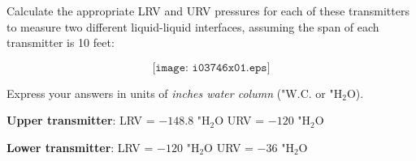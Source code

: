 

Calculate the appropriate LRV and URV pressures for each of these transmitters to measure two different liquid-liquid interfaces, assuming the span of each transmitter is 10 feet:

$$\texttt{[image: i03746x01.eps]}$$

Express your answers in units of {\it inches water column} ("W.C. or "H$_{2}$O).







{\bf Upper transmitter}: \hskip 20pt LRV = $-148.8$ "H$_{2}$O \hskip 50pt URV = $-120$ "H$_{2}$O

\vskip 10pt

{\bf Lower transmitter}: \hskip 20pt LRV = $-120$ "H$_{2}$O \hskip 50pt URV = $-36$ "H$_{2}$O










